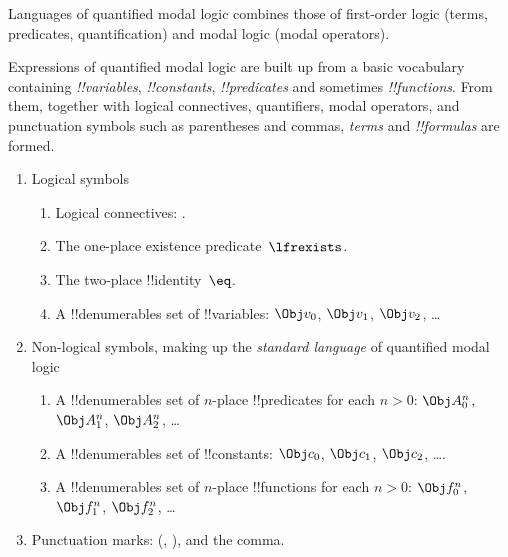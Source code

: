 \documentclass[../../../include/open-logic-section]{subfiles}
\begin{document}


\begin{explain}
Languages of quantified modal logic combines those of
first-order logic (terms, predicates, quantification)
and modal logic (modal operators).
\end{explain}

Expressions of quantified modal logic are built up from a basic vocabulary
containing \emph{!!{variable}s}, \emph{!!{constant}s},
\emph{!!{predicate}s} and sometimes \emph{!!{function}s}.  From them,
together with logical connectives, quantifiers, modal operators, 
and punctuation symbols such as parentheses and commas, \emph{terms} and
\emph{!!{formula}s} are formed. 

\begin{enumerate}
\item Logical symbols
\begin{enumerate}
\item Logical connectives:
  \startycommalist
  .
\item The one-place existence predicate~$\lfrexists$.
\item The two-place !!{identity}~$\eq$.
\item A !!{denumerable}s set of !!{variable}s: $\Obj v_0$, $\Obj v_1$, $\Obj
  v_2$, \dots
\end{enumerate}
\item Non-logical symbols, making up the \emph{standard
  language} of quantified modal logic
\begin{enumerate}
\item A !!{denumerable}s set of $n$-place !!{predicate}s for each $n>0$: $\Obj
  A^n_0$, $\Obj A^n_1$, $\Obj A^n_2$, \dots
\item A !!{denumerable}s set of !!{constant}s: $\Obj c_0$, $\Obj c_1$, $\Obj
  c_2$, \dots.
\item A !!{denumerable}s set of $n$-place !!{function}s for each $n>0$:
  $\Obj f^n_0$, $\Obj f^n_1$, $\Obj f^n_2$, \dots
\end{enumerate}
\item Punctuation marks: (, ), and the comma.
\end{enumerate}
\end{document}
